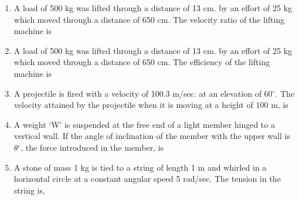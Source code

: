 \documentclass[11pt,a4paper]{article}
\begin{document}
\begin{enumerate}
\item{A load of 500 kg was lifted through a distance of 13 cm. by an effort of 25 kg which moved through a distance of 650 cm. The velocity ratio of the lifting machine is}
\\
\item{A load of 500 kg was lifted through a distance of 13 cm. by an effort of 25 kg which moved through a distance of 650 cm. The efficiency of the lifting machine is}
\\
\item{A projectile is fired with a velocity of 100.3 m/sec. at an elevation of 60$^\circ$. The velocity attained by the projectile when it is moving at a height of 100 m, is
}
\\
\item{A weight `W' is suspended at the free end of a light member hinged to a vertical wall. If the angle of inclination of the member with the upper wall is $\theta$$^\circ$, the force introduced in the member, is
}
\\
\item{A stone of mass 1 kg is tied to a string of length 1 m and whirled in a horizontal circle at a constant angular speed 5 rad/sec. The tension in the string is,}

\end{enumerate}
\end{document}
